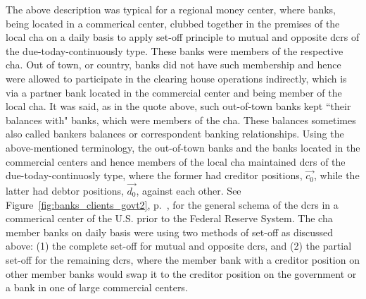 The above description was typical for a regional money center, where banks, being located in a commerical center, clubbed together in the premises of the local \ac{cha} on a daily basis to apply set-off principle to mutual and opposite \acfp{dcr} of the due-today-continuously type. These banks were members of the respective \ac{cha}. Out of town, or country, banks did not have such membership and hence were allowed to participate in the clearing house operations indirectly, which is via a partner bank located in the commercial center and being member of the local \ac{cha}. It was said, as in the quote above, such out-of-town banks kept ``their balances with" banks, which were members of the \ac{cha}. These balances sometimes also called bankers balances or correspondent banking relationships. Using the above-mentioned terminology, the out-of-town banks and the banks located in the commercial centers and hence members of the local \ac{cha} maintained \acfp{dcr} of the due-today-continuosly type, where the former had creditor positions, $\overrightarrow{c_0}$, while the latter had debtor positions, $\overrightarrow{d_0}$, against each other. See Figure~\ref{fig:banks_clients_govt2}, p.~\pageref{fig:banks_clients_govt2}, for the general schema of the \acfp{dcr} in a commerical center of the U.S. prior to the Federal Reserve System. The \ac{cha} member banks on daily basis were using two methods of set-off as discussed above: (1) the complete set-off for mutual and opposite \acp{dcr}, and (2) the partial set-off for the remaining \acp{dcr}, where the member bank with a creditor position on other member banks would swap it to the creditor position on the government or a bank in one of large commercial centers.  

